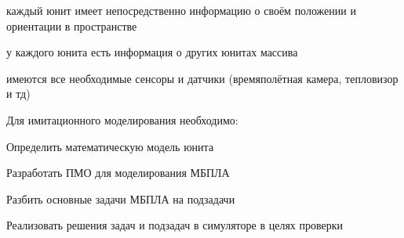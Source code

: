 \begin{mintemize}
\item каждый юнит имеет непосредственно информацию о своём положении и ориентации в пространстве
\item у каждого юнита есть информация о других юнитах массива
\item имеются все необходимые сенсоры и датчики (времяполётная камера, тепловизор и тд)
\end{mintemize}

Для имитационного моделирования необходимо:

\begin{mintemize}
\item Определить математическую модель юнита
\item Разработать ПМО для моделирования МБПЛА
\item Разбить основные задачи МБПЛА на подзадачи
\item Реализовать решения задач и подзадач в симуляторе
      в целях проверки
\end{mintemize}
